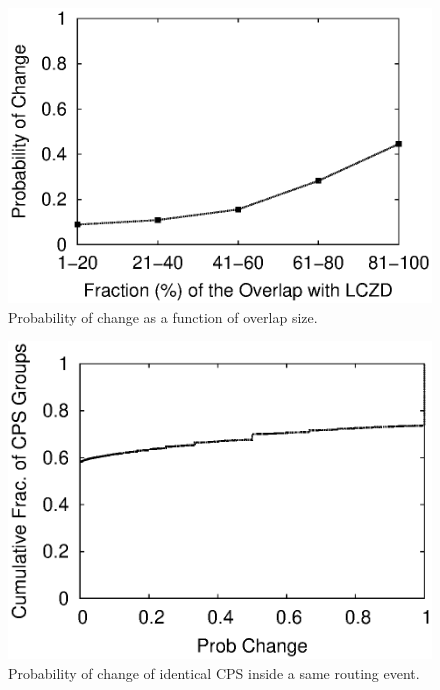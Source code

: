 
\begin{figure}
\begin{center}
\includegraphics[width=1.05\columnwidth]{figs/patching/probchange/probchange.eps}
\caption{Probability of change as a function of overlap size.}
\label{fig:overlap.change.prob}
\end{center}
\end{figure}

\begin{figure}
\begin{center}
\includegraphics[width=1.05\columnwidth]{figs/patching/probcpschange/prob_cps.eps}
\caption{Probability of change of identical CPS inside a same routing event.}
\label{fig:overlap.change.prob}
\end{center}
\end{figure}


